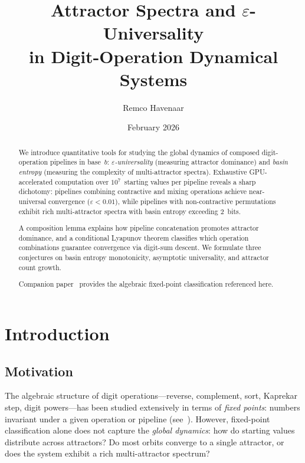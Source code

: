\documentclass[11pt,a4paper]{amsart}
\title[Attractor Spectra of Digit-Operation Pipelines]{Attractor Spectra and $\varepsilon$-Universality\\
in Digit-Operation Dynamical Systems}
\author{Remco Havenaar}
\date{February 2026}
\theoremstyle{plain}
\theoremstyle{definition}
\theoremstyle{remark}
\begin{document}
\begin{abstract}
We introduce quantitative tools for studying the global dynamics of composed
digit-operation pipelines in base~$b$: \emph{$\varepsilon$-universality}
(measuring attractor dominance) and \emph{basin entropy} (measuring the
complexity of multi-attractor spectra). Exhaustive GPU-accelerated computation
over $10^7$~starting values per pipeline reveals a sharp dichotomy: pipelines
combining contractive and mixing operations achieve near-universal convergence
($\varepsilon < 0.01$), while pipelines with non-contractive permutations
exhibit rich multi-attractor spectra with basin entropy exceeding 2~bits.

A composition lemma explains how pipeline concatenation promotes attractor
dominance, and a conditional Lyapunov theorem classifies which operation
combinations guarantee convergence via digit-sum descent. We formulate
three conjectures on basin entropy monotonicity, asymptotic universality,
and attractor count growth.

Companion paper~\cite{PaperA} provides the algebraic fixed-point
classification referenced here.
\end{abstract}

\maketitle

\section{Introduction}\label{sec:intro}

\subsection{Motivation}

The algebraic structure of digit operations---reverse, complement, sort,
Kaprekar step, digit powers---has been studied extensively in terms of
\emph{fixed points}: numbers invariant under a given operation or pipeline
(see~\cite{PaperA, Kaprekar1955, Berger1992}). However, fixed-point
classification alone does not capture the \emph{global dynamics}: how do
starting values distribute across attractors? Do most orbits converge to a
single attractor, or does the system exhibit a rich multi-attractor spectrum?
\end{document}

